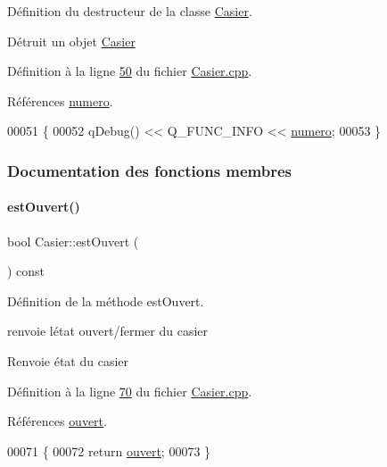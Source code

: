 Définition du destructeur de la classe \hyperlink{class_casier}{Casier}. 

Détruit un objet \hyperlink{class_casier}{Casier} 

Définition à la ligne \hyperlink{_casier_8cpp_source_l00050}{50} du fichier \hyperlink{_casier_8cpp_source}{Casier.\+cpp}.



Références \hyperlink{_casier_8h_source_l00044}{numero}.


\begin{DoxyCode}
00051 \{
00052     qDebug() << Q\_FUNC\_INFO << \hyperlink{class_casier_a17aa23e73b177559266a9fb17f63b812}{numero};
00053 \}
\end{DoxyCode}


\subsubsection{Documentation des fonctions membres}
\mbox{\label{class_casier_ab26fd4da845423355835da8d445ed5dd}} 
\paragraph{\texorpdfstring{est\+Ouvert()}{estOuvert()}}
{\footnotesize\ttfamily bool Casier\+::est\+Ouvert (\begin{DoxyParamCaption}{ }\end{DoxyParamCaption}) const}



Définition de la méthode est\+Ouvert. 

renvoie l\textquotesingle{}état ouvert/fermer du casier \begin{DoxyReturn}{Renvoie}
état du casier 
\end{DoxyReturn}


Définition à la ligne \hyperlink{_casier_8cpp_source_l00070}{70} du fichier \hyperlink{_casier_8cpp_source}{Casier.\+cpp}.



Références \hyperlink{_casier_8h_source_l00045}{ouvert}.


\begin{DoxyCode}
00071 \{
00072     \textcolor{keywordflow}{return} \hyperlink{class_casier_afe544ed1a87ce714a9fbbe16126669e4}{ouvert};
00073 \}
\end{DoxyCode}
\mbox{\label{class_casier_a061b024a2733a5bb1dfcc43bb0022707}} 
